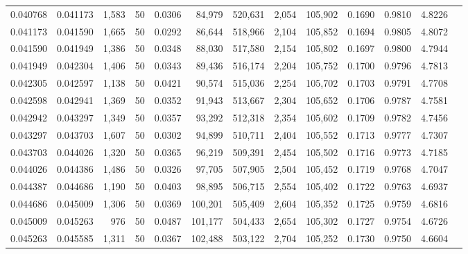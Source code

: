 \begin{tabular}{rrrrrrrrrrrrr}
0.040768 & 0.041173 & 1,583 &  50 &                                     0.0306 &  84,979 & 520,631 &   2,054 & 105,902 & 0.1690 & 0.9810 & 4.8226 \\
0.041173 & 0.041590 & 1,665 &  50 &                                     0.0292 &  86,644 & 518,966 &   2,104 & 105,852 & 0.1694 & 0.9805 & 4.8072 \\
0.041590 & 0.041949 & 1,386 &  50 &                                     0.0348 &  88,030 & 517,580 &   2,154 & 105,802 & 0.1697 & 0.9800 & 4.7944 \\
0.041949 & 0.042304 & 1,406 &  50 &                                     0.0343 &  89,436 & 516,174 &   2,204 & 105,752 & 0.1700 & 0.9796 & 4.7813 \\
0.042305 & 0.042597 & 1,138 &  50 &                                     0.0421 &  90,574 & 515,036 &   2,254 & 105,702 & 0.1703 & 0.9791 & 4.7708 \\
0.042598 & 0.042941 & 1,369 &  50 &                                     0.0352 &  91,943 & 513,667 &   2,304 & 105,652 & 0.1706 & 0.9787 & 4.7581 \\
0.042942 & 0.043297 & 1,349 &  50 &                                     0.0357 &  93,292 & 512,318 &   2,354 & 105,602 & 0.1709 & 0.9782 & 4.7456 \\
0.043297 & 0.043703 & 1,607 &  50 &                                     0.0302 &  94,899 & 510,711 &   2,404 & 105,552 & 0.1713 & 0.9777 & 4.7307 \\
0.043703 & 0.044026 & 1,320 &  50 &                                     0.0365 &  96,219 & 509,391 &   2,454 & 105,502 & 0.1716 & 0.9773 & 4.7185 \\
0.044026 & 0.044386 & 1,486 &  50 &                                     0.0326 &  97,705 & 507,905 &   2,504 & 105,452 & 0.1719 & 0.9768 & 4.7047 \\
0.044387 & 0.044686 & 1,190 &  50 &                                     0.0403 &  98,895 & 506,715 &   2,554 & 105,402 & 0.1722 & 0.9763 & 4.6937 \\
0.044686 & 0.045009 & 1,306 &  50 &                                     0.0369 & 100,201 & 505,409 &   2,604 & 105,352 & 0.1725 & 0.9759 & 4.6816 \\
0.045009 & 0.045263 &   976 &  50 &                                     0.0487 & 101,177 & 504,433 &   2,654 & 105,302 & 0.1727 & 0.9754 & 4.6726 \\
0.045263 & 0.045585 & 1,311 &  50 &                                     0.0367 & 102,488 & 503,122 &   2,704 & 105,252 & 0.1730 & 0.9750 & 4.6604 \\

\end{tabular}
